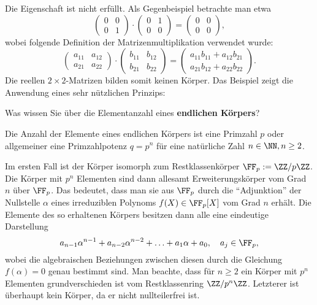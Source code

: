 \begin{antwort}
  Die Eigenschaft ist nicht erfüllt. Als Gegenbeispiel betrachte man etwa 
  \[
  \left(\begin{array}{rr} 0 & 0 \\ 0 & 1 \end{array}\right) \cdot 
  \left(\begin{array}{cc} 0 & 1 \\ 0 & 0 \end{array}\right) = 
  \left(\begin{array}{cc} 0 & 0 \\ 0 & 0  \end{array}\right),
  \]
wobei folgende Definition der 
Matrizenmultiplikation 
verwendet wurde:
\[
\left(\begin{array}{rr} 
a_{11} & a_{12} \\ a_{21} & a_{22} 
\end{array}\right)
\cdot 
\left(\begin{array}{rr} 
b_{11} & b_{12} \\ b_{21} & b_{22} 
\end{array}\right)
=
\left(
\begin{array}{rr}
a_{11}b_{11} + a_{12}b_{21} \\
a_{21}b_{12} + a_{22}b_{22} 
\end{array}
\right).
\]
  Die reellen $2\times 2$-Matrizen bilden somit keinen Körper. 
  Das Beispiel zeigt die Anwendung eines sehr nützlichen Prinzips: 
  \AntEnd
\end{antwort} 

\begin{frage} 
  Was wissen Sie über die Elementanzahl eines 
  \textbf{endlichen Körpers}?
\end{frage}

\begin{antwort}
  Die Anzahl der Elemente eines endlichen Körpers ist eine Primzahl 
  $p$ oder allgemeiner 
  eine Primzahlpotenz $q=p^n$ für eine natürliche Zahl $n\in\NN, n\ge 2$. 

  Im ersten Fall ist der Körper isomorph zum Restklassenkörper  
  $\FF_p:=\ZZ/p\ZZ$. 
  Die Körper mit $p^n$ Elementen sind dann allesamt  
  Erweiterungskörper vom Grad 
  $n$ über $\FF_p$. 
  Das bedeutet, dass man sie aus $\FF_p$ 
  durch die "`Adjunktion"' der Nullstelle 
  $\alpha$ eines 
  irreduziblen Polynoms $f(X)\in\FF_p[X]$ vom Grad $n$ erhält. 
  Die Elemente des so erhaltenen Körpers besitzen dann alle 
  eine eindeutige Darstellung 
  \[
  a_{n-1} \alpha^{n-1} + a_{n-2}\alpha^{n-2}+\ldots + a_{1}\alpha + a_{0}, 
  \quad a_j \in \FF_p,
  \]
  wobei die algebraischen Beziehungen zwischen diesen durch die
  Gleichung $f(\alpha) = 0$ genau bestimmt sind. 
  Man beachte, dass für $n\ge2$ ein Körper mit $p^n$ Elementen grundverschieden ist vom  
  Restklassenring $\ZZ/p^n\ZZ$. Letzterer ist überhaupt kein Körper, da er 
  nicht nullteilerfrei ist. 
  \AntEnd
\end{antwort}


